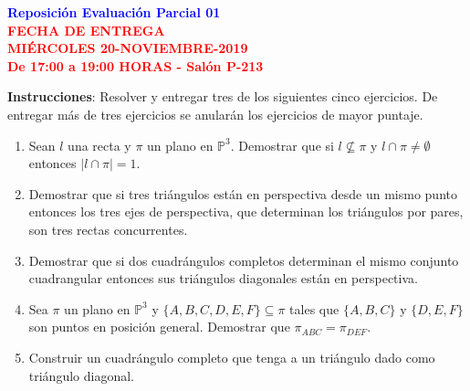 \documentclass[12pt]{report}
\numberwithin{section}{chapter}
\newcommand{\p}{\mathbb P}
\begin{document}
\begin{center}
\textcolor{blue}{\textbf{\large Reposición Evaluación Parcial 01}}\\
\vspace{0.5 cm}
\textcolor{red}{\textbf{\large FECHA DE ENTREGA \\ MIÉRCOLES 20-NOVIEMBRE-2019\\ De 17:00 a 19:00 HORAS - Salón P-213}}
\end{center}

\textbf{Instrucciones}: Resolver y entregar tres de los siguientes cinco ejercicios. De entregar más de tres ejercicios se anularán los ejercicios de mayor puntaje.


\begin{enumerate}
\item Sean $l$ una recta y $\pi$ un plano en $\p^3$. Demostrar que si $l \not\subseteq \pi$ y $l \cap \pi \neq \emptyset$ entonces $|l\cap \pi|= 1$.

\item Demostrar que si tres triángulos están en perspectiva desde un mismo punto entonces los tres ejes de perspectiva, que determinan los triángulos por pares, son tres rectas concurrentes.

\item Demostrar que si dos cuadrángulos completos determinan el mismo conjunto cuadrangular entonces sus triángulos diagonales están en perspectiva.

\item Sea $\pi$ un plano en $\p^3$ y $\{A,B,C,D,E,F\} \subseteq \pi$ tales que $\{A,B,C\}$ y $\{D,E,F\}$ son puntos en posición general. Demostrar que $\pi_{ABC}=\pi_{DEF}$.

\item Construir un cuadrángulo completo que tenga a un triángulo dado como triángulo diagonal.
\end{enumerate}
\end{document}
